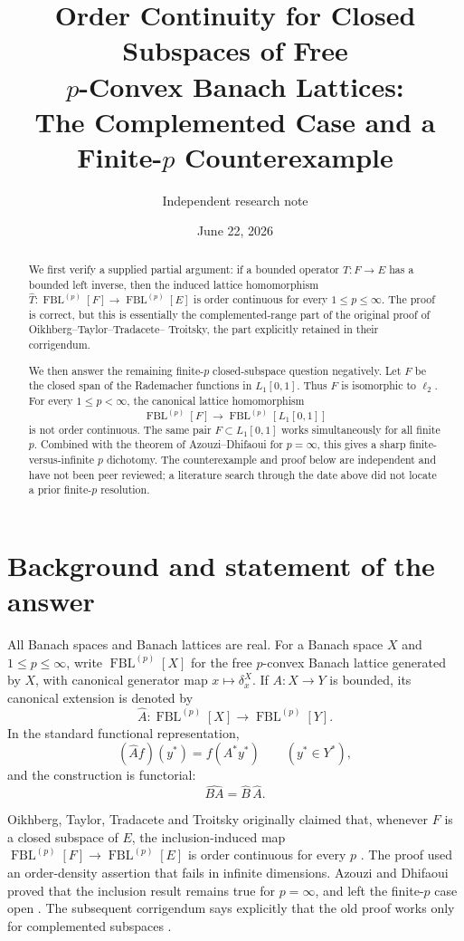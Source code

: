\documentclass[11pt]{article}
\title{Order Continuity for Closed Subspaces of Free \\[-1mm]
\(p\)-Convex Banach Lattices:\\
The Complemented Case and a Finite-\(p\) Counterexample}
\author{Independent research note}
\date{June 22, 2026}
\theoremstyle{remark}
\newcommand{\FBL}[2]{\operatorname{FBL}^{(#1)}[#2]}
\newcommand{\wh}[1]{\widehat{#1}}
\begin{document}
\maketitle

\begin{abstract}
We first verify a supplied partial argument: if a bounded operator
\(T:F\to E\) has a bounded left inverse, then the induced lattice
homomorphism
\(\wh T:\FBL{p}{F}\to\FBL{p}{E}\) is order continuous for every
\(1\le p\le\infty\).  The proof is correct, but this is essentially the
complemented-range part of the original proof of Oikhberg--Taylor--Tradacete--
Troitsky, the part explicitly retained in their corrigendum.

We then answer the remaining finite-\(p\) closed-subspace question negatively.
Let \(F\) be the closed span of the Rademacher functions in \(L_1[0,1]\).
Thus \(F\) is isomorphic to \(\ell_2\).  For every \(1\le p<\infty\), the
canonical lattice homomorphism
\[
  \FBL{p}{F}\longrightarrow \FBL{p}{L_1[0,1]}
\]
is not order continuous.  The same pair \(F\subset L_1[0,1]\) works
simultaneously for all finite \(p\).  Combined with the theorem of
Azouzi--Dhifaoui for \(p=\infty\), this gives a sharp finite-versus-infinite
\(p\) dichotomy.  The counterexample and proof below are independent and
have not been peer reviewed; a literature search through the date above did
not locate a prior finite-\(p\) resolution.
\end{abstract}

\section{Background and statement of the answer}

All Banach spaces and Banach lattices are real.  For a Banach space \(X\)
and \(1\le p\le\infty\), write \(\FBL{p}{X}\) for the free \(p\)-convex
Banach lattice generated by \(X\), with canonical generator map
\(x\mapsto\delta_x^X\).  If \(A:X\to Y\) is bounded, its canonical extension
is denoted by
\[
  \wh A:\FBL{p}{X}\longrightarrow\FBL{p}{Y}.
\]
In the standard functional representation,
\[
  (\wh A f)(y^*)=f(A^*y^*) \qquad (y^*\in Y^*),                 \tag{1.1}
\]
and the construction is functorial:
\[
  \widehat{BA}=\wh B\,\wh A.                                  \tag{1.2}
\]

Oikhberg, Taylor, Tradacete and Troitsky originally claimed that, whenever
\(F\) is a closed subspace of \(E\), the inclusion-induced map
\(\FBL{p}{F}\to\FBL{p}{E}\) is order continuous for every \(p\)
\cite[Theorem~3.4]{OTTT}.  The proof used an order-density assertion that
fails in infinite dimensions.  Azouzi and Dhifaoui proved that the inclusion
result remains true for \(p=\infty\), and left the finite-\(p\) case open
\cite[Theorem~11]{AD}.  The subsequent corrigendum says explicitly that the
old proof works only for complemented subspaces \cite{Corr}.
\end{document}
